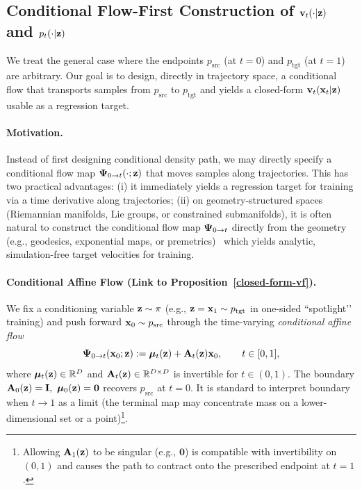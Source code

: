 \subsection{Conditional Flow-First Construction of ${\mathbf{v}}_t(\cdot|{\mathbf{z}})$ and $p_t(\cdot|{\mathbf{z}})$}\label{subsec:prob-path-flow}

We treat the general case where the endpoints $p_{\mathrm{src}}$ (at $t=0$) and $p_{\mathrm{tgt}}$ (at $t=1$) are arbitrary. 
Our goal is to design, directly in trajectory space, a conditional flow that transports samples from $p_{\mathrm{src}}$ to $p_{\mathrm{tgt}}$ and yields a closed-form ${\mathbf{v}}_t({\mathbf{x}}_t|{\mathbf{z}})$ usable as a regression target.

\paragraph{Motivation.}
Instead of first designing conditional density path, we may directly specify a conditional flow map ${\bm{\Psi}}_{0\to t}(\cdot;{\mathbf{z}})$ that moves samples along trajectories. This has two practical advantages: (i) it immediately yields a regression target for training via a time derivative along trajectories; (ii) on geometry-structured spaces (Riemannian manifolds, Lie groups, or constrained submanifolds), it is often natural to construct the conditional flow map 
${\bm{\Psi}}_{0\to t}$ directly from the geometry (e.g., geodesics, exponential maps, or premetrics)~\citep{lipman2024flow} which yields analytic, simulation-free target velocities for training.


\paragraph{Conditional Affine Flow (Link to Proposition~\ref{closed-form-vf}).}
We fix a conditioning variable ${\mathbf{z}}\sim\pi$ (e.g., ${\mathbf{z}}={\mathbf{x}}_1\sim p_{\mathrm{tgt}}$ in one-sided “spotlight’’ training) and push forward ${\mathbf{x}}_0\sim p_{\mathrm{src}}$ through the time-varying \emph{conditional affine flow} 
\[
{\bm{\Psi}}_{0\to t}({\mathbf{x}}_0;{\mathbf{z}}) := \bm\mu_t({\mathbf{z}}) + {\mathbf{A}}_t({\mathbf{z}}) {\mathbf{x}}_0,\qquad t\in[0,1],
\]
where $\bm\mu_t({\mathbf{z}})\in\mathbb{R}^D$ and ${\mathbf{A}}_t({\mathbf{z}})\in\mathbb{R}^{D\times D}$ is invertible for $t\in(0,1)$. The boundary 
$\rmA_0(\rvz)=\rmI,\ \bm\mu_0(\rvz)=\mathbf 0$ recovers $p_{\mathrm{src}}$ at $t=0$. It is standard to interpret boundary when $t\to1$ as a limit (the terminal map may concentrate mass on a lower-dimensional set or a point)\footnote{Allowing ${\mathbf{A}}_1({\mathbf{z}})$ to be singular (e.g., $\mathbf 0$) is compatible with invertibility on $(0,1)$ and causes the path to contract onto the prescribed endpoint at $t=1$.}. 


